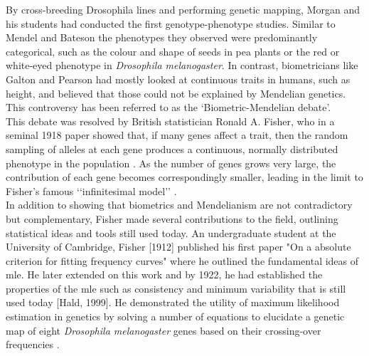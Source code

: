 By cross-breeding Drosophila lines and performing genetic mapping, Morgan and his students had conducted the first genotype-phenotype studies. 
Similar to Mendel and Bateson the phenotypes they observed were predominantly categorical, such as the colour and shape of seeds in pea plants or the red or white-eyed phenotype in \textit{Drosophila melanogaster}. 
In contrast, biometricians like Galton and Pearson had mostly looked at continuous traits in humans, such as height, and believed that those could not be explained by Mendelian genetics.
This controversy has been referred to as the ‘Biometric-Mendelian debate’.\\ 

This debate was resolved by British statistician Ronald A. Fisher, who in a seminal 1918 paper showed that, if many genes affect a trait, then the random sampling of alleles at each gene produces a continuous, normally distributed phenotype in the population \cite{fisher1919xv}. 
As the number of genes grows very large, the contribution of each gene becomes correspondingly smaller, leading in the limit to Fisher’s famous ‘‘infinitesimal model’’ \cite{barton2017infinitesimal}.\\

In addition to showing that biometrics and Mendelianism are not contradictory but complementary, Fisher made several contributions to the field, outlining statistical ideas and tools still used today. 
An undergraduate student at the University of Cambridge, Fisher [1912] published his first paper "On a absolute criterion for fitting frequency curves" where he outlined the fundamental ideas of \gls{mle}. 
He later extended on this work and by 1922, he had established the properties of the \gls{mle} such as consistency and minimum variability \cite{fisher1922mathematical} that is still used today [Hald, 1999]. 
He demonstrated the utility of maximum likelihood estimation in genetics by solving a number of equations to elucidate a genetic map of eight \textit{Drosophila melanogaster} genes based on their crossing-over frequencies \cite{fisher1922systematic}.\\ 


